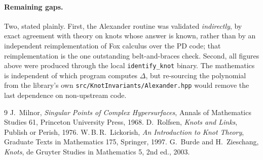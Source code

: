 \documentclass[11pt]{article}
\theoremstyle{definition}
\newcommand{\Deltaa}{\Delta}
\newcommand{\code}[1]{\texttt{#1}}
\begin{document}
\paragraph{Remaining gaps.} Two, stated plainly. First, the Alexander routine was
validated \emph{indirectly}, by exact agreement with theory on knots whose answer is
known, rather than by an independent reimplementation of Fox calculus over the PD code;
that reimplementation is the one outstanding belt-and-braces check. Second, all figures
above were produced through the local \code{identify\_knot} binary. The mathematics is
independent of which program computes $\Deltaa$, but re-sourcing the polynomial from
the library's own \code{src/KnotInvariants/Alexander.hpp} would remove the last
dependence on non-upstream code.

\begin{thebibliography}{9}
 J.~Milnor, \emph{Singular Points of Complex Hypersurfaces},
Annals of Mathematics Studies 61, Princeton University Press, 1968.
 D.~Rolfsen, \emph{Knots and Links}, Publish or Perish, 1976.
 W.\,B.\,R.~Lickorish, \emph{An Introduction to Knot Theory},
Graduate Texts in Mathematics 175, Springer, 1997.
 G.~Burde and H.~Zieschang, \emph{Knots}, de Gruyter Studies in
Mathematics 5, 2nd ed., 2003.
\end{thebibliography}
\end{document}
